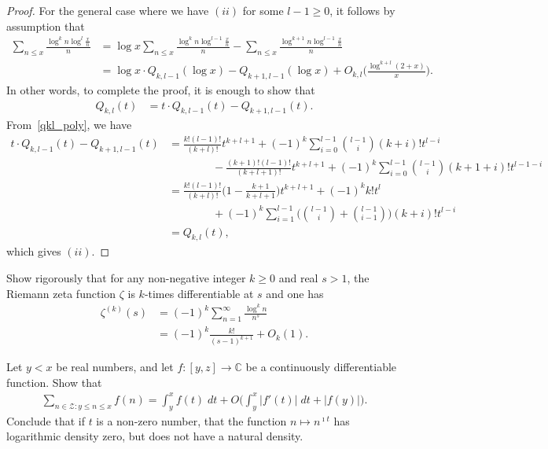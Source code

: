 \documentclass[11pt]{article}
\newenvironment{ex}[1]
  {\renewcommand\theinnercustomthm{#1}\innercustomthm}
  {\endinnercustomthm}
\begin{document}
\begin{proof}
For the general case where we have $(ii)$ for some $l-1\geq 0$, it follows by assumption that
\begin{align*}
\sum_{n\leq x}\frac{\log^k{n}\log^l{\frac{x}{n}}}{n} &= \log{x}\sum_{n\leq x}\frac{\log^k{n}\log^{l-1}{\frac{x}{n}}}{n} -\sum_{n\leq x}\frac{\log^{k+1}{n}\log^{l-1}{\frac{x}{n}}}{n}\\
&= \log{x}\cdot Q_{k,l-1}(\log{x})-Q_{k+1,l-1}(\log{x})+O_{k,l}\bigg(\frac{\log^{k+l}(2+x)}{x}\bigg).
\end{align*}
In other words, to complete the proof, it is enough to show that
\begin{align*}
Q_{k,l}(t) &= t\cdot Q_{k,l-1}(t)-Q_{k+1,l-1}(t).
\end{align*}
From~\eqref{qkl_poly}, we have
\begin{align*}
t\cdot Q_{k,l-1}(t)-Q_{k+1,l-1}(t) &= \frac{k!(l-1)!}{(k+l)!}t^{k+l+1}+(-1)^k\sum_{i=0}^{l-1}\binom{l-1}{i}(k+i)!t^{l-i}\\
& \qquad\qquad -\frac{(k+1)!(l-1)!}{(k+l+1)!}t^{k+l+1}+(-1)^k\sum_{i=0}^{l-1}\binom{l-1}{i}(k+1+i)!t^{l-1-i}\\
&= \frac{k!(l-1)!}{(k+l)!}\bigg(1-\frac{k+1}{k+l+1}\bigg)t^{k+l+1}+(-1)^kk!t^l\\
& \qquad\qquad +(-1)^k\sum_{i=1}^{l-1}\bigg(\binom{l-1}{i}+\binom{l-1}{i-1}\bigg)(k+i)!t^{l-i}\\
&= Q_{k,l}(t),
\end{align*}
which gives $(ii)$.
\end{proof}

\begin{ex}{10}\label{ten}
Show rigorously that for any non-negative integer $k\geq 0$ and real $s>1$, the Riemann zeta function $\zeta$ is $k$-times differentiable at $s$ and one has
\begin{align*}
\zeta^{(k)}(s) &= (-1)^k\sum_{n=1}^\infty\frac{\log^k{n}}{n^s}\\
&= (-1)^k\frac{k!}{(s-1)^{k+1}}+O_k(1).
\end{align*}
\end{ex}

\begin{ex}{11}\label{eleven}
Let $y<x$ be real numbers, and let $f:[y,z]\to\mathbb{C}$ be a continuously differentiable function. Show that
\begin{align*}
\sum_{n\in\mathcal{Z}:y\leq n\leq x}f(n)=\int_y^xf(t)\;dt+O\bigg(\int_y^x|f'(t)|\;dt+|f(y)|\bigg).
\end{align*}
Conclude that if $t$ is a non-zero number, that the function $n\mapsto n^{\imath t}$ has logarithmic density zero, but does not have a natural density.
\end{ex}
\end{document}
